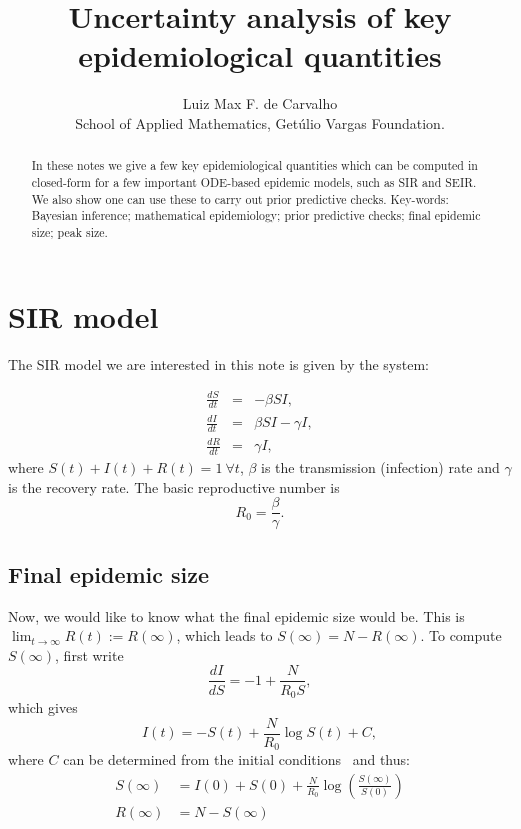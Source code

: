 \documentclass[a4paper, notitlepage, 10pt]{article}
\title{\vspace{-9ex}\centering \bf Uncertainty analysis of key epidemiological quantities}
\author{
Luiz Max F. de Carvalho\\
School of Applied Mathematics, Get\'ulio Vargas Foundation.
}
\begin{document}
\maketitle

\begin{abstract}
In these notes we give a few key epidemiological quantities which can be computed in closed-form for a few important ODE-based epidemic models, such as SIR and SEIR.
We also show one can use these to carry out prior predictive checks.
Key-words: Bayesian inference; mathematical epidemiology; prior predictive checks; final epidemic size; peak size. 
\end{abstract}

\section*{SIR model}

The SIR model we are interested in this note is given by the system:

\begin{eqnarray*}
\frac{dS}{dt}&=& - \beta SI,\\
\frac{dI}{dt}&=&  \beta SI - \gamma I,\\
\frac{dR}{dt}&=& \gamma I, 
\end{eqnarray*} 
where  $S(t) + I(t) + R(t) = 1 \: \forall t$, $\beta$ is the transmission (infection) rate and $\gamma$ is the recovery rate.
The basic reproductive number is 
\begin{equation}
\label{eq:r0def}
R_0 = \frac{\beta}{\gamma}. 
\end{equation}

\subsection*{Final epidemic size}

Now, we would like to know what the final epidemic size would be.
This is $\lim_{t \to \infty} R(t) := R(\infty)$, which leads to $S(\infty) = N - R(\infty)$.
To compute $S(\infty)$, first write 
\begin{equation}
 \frac{dI}{dS} = -1 + \frac{N}{R_0 S},
\end{equation}
which gives
\begin{equation}
\label{eq:I_of_t}
 I(t) = -S(t) + \frac{N}{R_0} \log S(t) + C,
\end{equation}
where $C$ can be determined from the initial conditions~\citep{Miller2012} and thus:
\begin{align}
    S(\infty)&= I(0) + S(0) + \frac{N}{R_0} \log\left(\frac{S(\infty)}{S(0)}\right)\\
    R(\infty) &= N - S(\infty)
\end{align}
\end{document}
